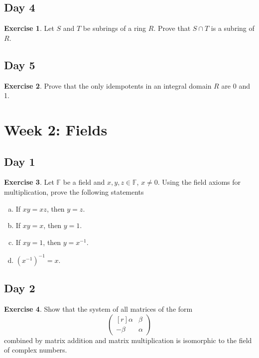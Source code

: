 \documentclass{article}
\theoremstyle{definition}
\newtheorem*{exercise}{Exercise}
\begin{document}
\subsection*{Day 4}
\begin{exercise}
    Let \(S\) and \(T\) be subrings of a ring \(R\). Prove that \(S\cap T\) is a subring of \(R\).
\end{exercise}

\subsection*{Day 5}
\begin{exercise}
    Prove that the only idempotents in an integral domain \(R\) are 0 and 1.
\end{exercise}

\section*{Week 2: Fields}

\subsection*{Day 1}
\begin{exercise}
    Let \(\mathbb{F}\) be a field and \(x,y,z\in\mathbb{F}\), \(x\neq0\). Using the field axioms for multiplication, prove the following statements
    \begin{enumerate}[(a)]
        \item If \(xy=xz\), then \(y=z\).
        \item If \(xy=x\), then \(y=1\).
        \item If \(xy=1\), then \(y=x^{-1}\).
        \item \((x^{-1})^{-1}=x\).
    \end{enumerate}
\end{exercise}

\subsection*{Day 2}
\begin{exercise}
    Show that the system of all matrices of the form
    \[\begin{pmatrix*}[r]
        \alpha & \beta \\
        -\beta & \alpha
    \end{pmatrix*}\]
    combined by matrix addition and matrix multiplication is isomorphic to the field of complex numbers.
\end{exercise}
\end{document}
